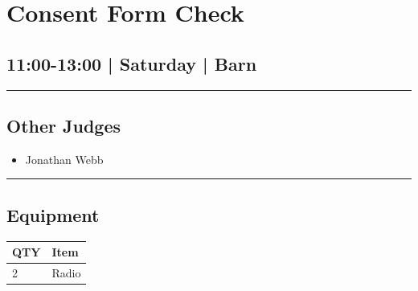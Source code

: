 \documentclass[10pt, A5]{article}
\begin{document}
        \begin{framed}
        \begin{minipage}{\textwidth}

        \setcounter{section}{7}
        \section{Consent Form Check}
        \subsection*{11:00-13:00 | Saturday | Barn}

        \vspace{0.25cm}
        \hrule
        \vspace{0.25cm}


        \subsection*{Other Judges}
                    

        	\begin{multicols}{2}

		\begin{itemize}
									\item Jonathan Webb
						\end{itemize}

		\vfill\null
		\columnbreak

		\begin{itemize}
						\end{itemize}

		\vfill\null

		\end{multicols}

    \vspace{0.25cm}
        \hrule
        \vspace{0.25cm}

        \begin{multicols}{2}

		\section*{\faWrench \: Equipment}

		
	\begin{center}
			\begin{tabular}{p{2cm}p{4cm}}


				\textbf{QTY} & \textbf{Item} \\\toprule
												2&Radio\\\midrule
								\end{tabular}


\end{center}
\end{multicols}
\end{minipage}
\end{framed}
\end{document}

